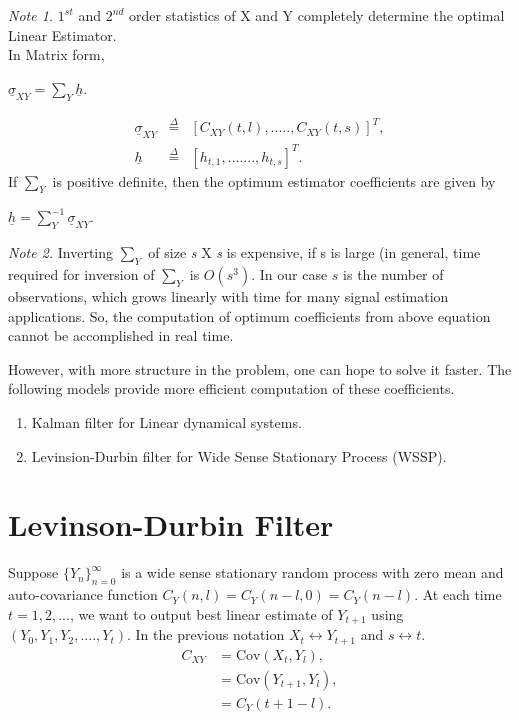 \documentclass[a4paper,english,12pt]{article}
\begin{document}
\textit{Note 1.}
$1^{st}$ and $2^{nd}$ order statistics of X and Y completely determine the optimal Linear Estimator.\\
In Matrix form,
\begin{center}
$\underline{\sigma}_{XY} = \sum_Y \underline{h} \nonumber$.
\end{center}    
\begin{eqnarray}
\underline{\sigma}_{XY} & \overset{\Delta}{=} & [C_{XY}(t,l),.....,C_{XY}(t,s)]^T,\nonumber \\
\underline{h} & \overset{\Delta}{=} & [h_{t,1},.......,h_{t,s}]^T. \nonumber
\end{eqnarray}
If $\sum_{Y}$ is positive definite, then the optimum estimator coefficients are given by
\begin{center}
$\underline{h} =  \sum_{Y}^{-1}\underline{\sigma}_{XY}.$
\end{center}
\textit{Note 2.}
Inverting $\sum_Y$ of size \textit{s} X \textit{s} is expensive, if s is large (in general, time required for inversion of $\sum_{Y}$ is $O(s^3)$. In our case $s$ is the number of observations, which grows linearly with time for many signal estimation applications. So, the computation of optimum coefficients from above equation cannot be accomplished in real time.
\par However, with more structure in the problem, one can hope to solve it faster.
The following models provide more efficient computation of these coefficients.
\begin{enumerate}
\item Kalman filter for Linear dynamical systems.
\item Levinsion-Durbin filter for Wide Sense Stationary Process (WSSP).
\end{enumerate}
\section{Levinson-Durbin Filter}
Suppose $\{Y_n\}_{n=0}^\infty$ is a wide sense stationary random process with zero mean and auto-covariance function $C_Y(n,l)=C_Y(n-l,0)=C_Y(n-l)$. At each time $t=1,2,...$, we want to output best linear estimate of $Y_{t+1}$ using $(Y_0,Y_1,Y_2,....,Y_t)$. In the previous notation $X_t \leftrightarrow Y_{t+1}$ and $s \leftrightarrow t$.
\begin{align}
C_{XY}&=\text{Cov}(X_t,Y_l), \nonumber\\
&=\text{Cov}(Y_{t+1},Y_l), \nonumber\\
&=C_Y(t+1-l). \nonumber
\end{align}
\end{document}
